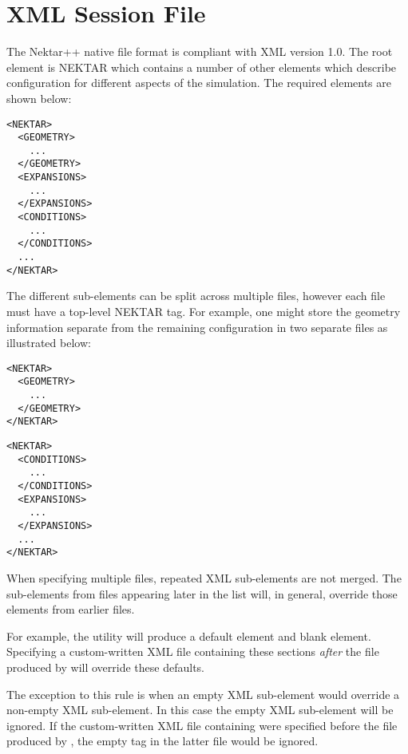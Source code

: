 \chapter{XML Session File}
\label{s:xml}

The Nektar++ native file format is compliant with XML version 1.0. The root
element is NEKTAR which contains a number of other elements which describe
configuration for different aspects of the simulation. The required elements are
shown below:
\begin{lstlisting}[style=XMLStyle]
<NEKTAR>
  <GEOMETRY>
    ...
  </GEOMETRY>
  <EXPANSIONS>
    ...
  </EXPANSIONS>
  <CONDITIONS>
    ...
  </CONDITIONS>
  ...
</NEKTAR>
\end{lstlisting}
The different sub-elements can be split across multiple files, however each
file must have a top-level NEKTAR tag. For example, one might store the
geometry information separate from the remaining configuration in two separate
files as illustrated below:

\begin{lstlisting}[style=XMLStyle]
<NEKTAR>
  <GEOMETRY>
    ...
  </GEOMETRY>
</NEKTAR>
\end{lstlisting}

\begin{lstlisting}[style=XMLStyle]
<NEKTAR>
  <CONDITIONS>
    ...
  </CONDITIONS>
  <EXPANSIONS>
    ...
  </EXPANSIONS>
  ...
</NEKTAR>
\end{lstlisting}

\begin{notebox}
    When specifying multiple files, repeated XML sub-elements are not merged.
    The sub-elements from files appearing later in the list will, in general,
    override those elements from earlier files.
    \medskip
    
    For example, the  utility will produce a default
     element and blank  element. Specifying
    a custom-written XML file containing these sections \emph{after} the
    file produced by  will override these defaults.

    The exception to this rule is when an empty XML sub-element would override a
    non-empty XML sub-element. In this case the empty XML sub-element will be
    ignored. If the custom-written XML file containing  were
    specified before the file produced by , the empty
     tag in the latter file would be ignored.
\end{notebox}














